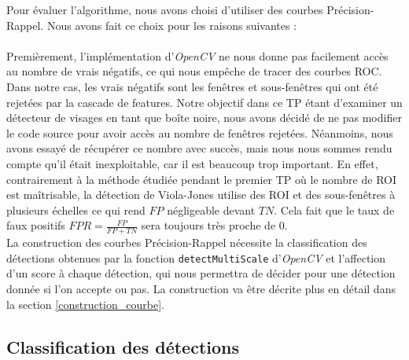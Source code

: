 \documentclass[a4paper,11pt]{article}
\begin{document}
        Pour évaluer l'algorithme, nous avons choisi d'utiliser des courbes Précision-Rappel. 
        Nous avons fait ce choix pour les raisons suivantes :\\\\
        Premièrement, l'implémentation d'{\it OpenCV} ne nous donne pas facilement accès au nombre de vrais négatifs, ce qui nous empêche de tracer des courbes ROC.
        Dans notre cas, les vrais négatifs sont les fenêtres et sous-fenêtres qui ont été rejetées par la cascade de features.
        Notre objectif dans ce TP étant d'examiner un détecteur de visages en tant que boîte noire, nous avons décidé de ne pas modifier le code source pour avoir accès au nombre de fenêtres rejetées.
        Néanmoins, nous avons essayé de récupérer ce nombre avec succès, mais nous nous sommes rendu compte qu'il était inexploitable, car il est beaucoup trop important.
        En effet, contrairement à la méthode étudiée pendant le premier TP où le nombre de ROI est maîtrisable, la détection de Viola-Jones utilise des ROI et des sous-fenêtres à plusieurs échelles ce qui rend $FP$ négligeable devant $TN$.
        Cela fait que le taux de faux positifs $FPR = \frac{FP}{FP+TN}$ sera toujours très proche de $0$.
        \\
        La construction des courbes Précision-Rappel nécessite la classification des détections obtenues par la fonction \verb!detectMultiScale! d'{\it OpenCV} et l'affection d'un score à chaque détection, qui nous permettra de décider pour une détection donnée si l'on accepte ou pas. La construction va être décrite plus en détail dans la section  \ref{construction_courbe}.
        
    \subsection{Classification des détections}
        
\end{document}
